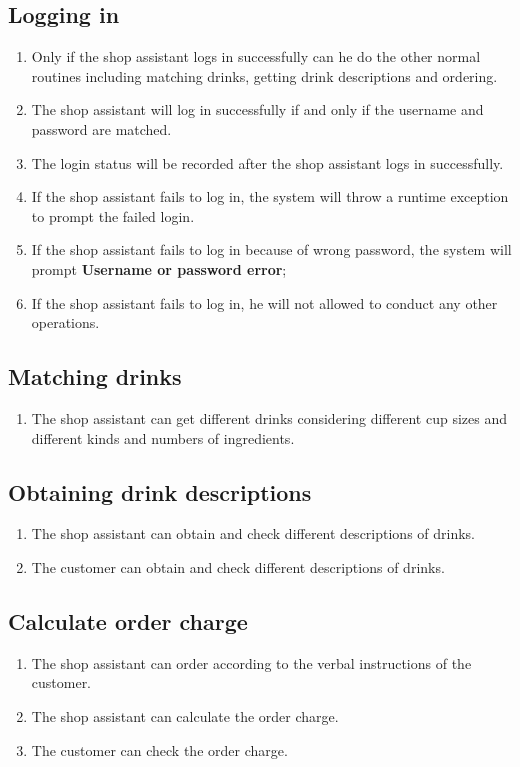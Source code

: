 \documentclass[a4paper]{report}
\begin{document}
\subsection{Logging in}
\begin{enumerate}
\item Only if the shop assistant logs in successfully can he do the other normal routines including matching drinks, getting drink descriptions and ordering.
\item The shop assistant will log in successfully if and only if the username and password are matched.
\item The login status will be recorded after the shop assistant logs in successfully.
\item If the shop assistant fails to log in, the system will throw a runtime exception to prompt the failed login.
\item If the shop assistant fails to log in because of wrong password, the system will prompt \textbf{Username or password error};
\item If the shop assistant fails to log in, he will not allowed to conduct any other operations.
\end{enumerate}

\subsection{Matching drinks}

\begin{enumerate}
\item The shop assistant can get different drinks considering different cup sizes and different kinds and numbers of ingredients.
\end{enumerate}


\subsection{Obtaining drink descriptions}
\begin{enumerate}
\item The shop assistant can obtain and check different descriptions of drinks.
\item The customer can obtain and check different descriptions of drinks.
\end{enumerate}

\subsection{Calculate order charge}
\begin{enumerate}
\item The shop assistant can order according to the verbal instructions of the customer.
\item The shop assistant can calculate the order charge.
\item The customer can check the order charge. 
\end{enumerate}
\end{document}
